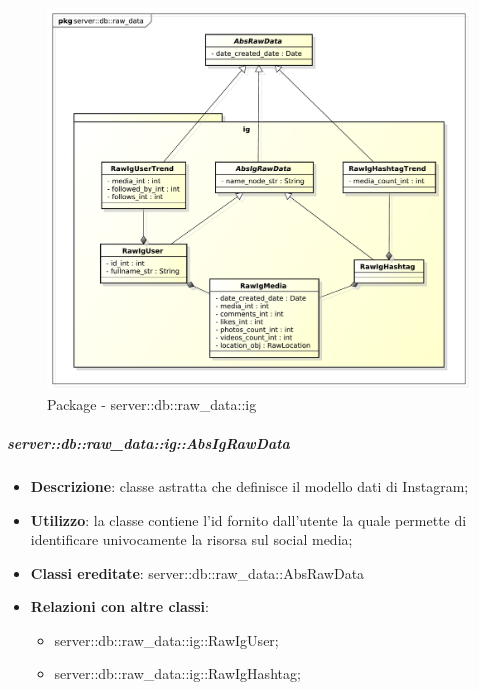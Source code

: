 

		\begin{figure}[htbp]
			\centering
			\centerline{\includegraphics[scale=0.5]{./images/server/raw_data_ig.pdf}}
			\caption{Package - server::db::raw\_data::ig}
		\end{figure}

		
		\subparagraph{server::db::raw\_data::ig::AbsIgRawData} %
		\label{subp:server_db_raw_data_ig_absigrawdata}
			\begin{itemize}
				\item \textbf{Descrizione}: classe astratta che definisce il modello dati di Instagram;
				\item \textbf{Utilizzo}: la classe contiene l'id fornito dall'utente la quale permette di identificare univocamente la risorsa sul social media;
				\item \textbf{Classi ereditate}: server::db::raw\_data::AbsRawData
				\item \textbf{Relazioni con altre classi}:
					\begin{itemize}
						\item server::db::raw\_data::ig::RawIgUser;
						\item server::db::raw\_data::ig::RawIgHashtag;
					\end{itemize}
			\end{itemize}



